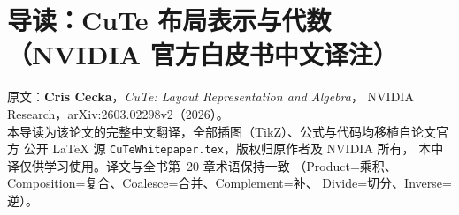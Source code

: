 \setcounter{section}{0}
\setcounter{subsection}{0}
\setcounter{subsubsection}{0}
\setcounter{figure}{0}
\setcounter{table}{0}
\setcounter{equation}{0}
\setcounter{theorem}{0}
\renewcommand{\thesection}{\arabic{section}}
\renewcommand{\thesubsection}{\arabic{section}.\arabic{subsection}}
\renewcommand{\thesubsubsection}{\arabic{section}.\arabic{subsection}.\arabic{subsubsection}}
\renewcommand{\thefigure}{W.\arabic{figure}}
\renewcommand{\thetable}{W.\arabic{table}}
\renewcommand{\theequation}{W.\arabic{equation}}
\renewcommand{\thetheorem}{W.\arabic{theorem}}
\def\wph#1{\section{#1}}
\def\wpsh#1{\subsection{#1}}
\def\wpssh#1{\subsubsection{#1}}

\chapter*{导读：CuTe 布局表示与代数\\（NVIDIA 官方白皮书中文译注）}

\begin{center}
\small
原文：\textbf{Cris Cecka}，\emph{CuTe: Layout Representation and Algebra}，
NVIDIA Research，arXiv:2603.02298v2（2026）。\\[2pt]
本导读为该论文的完整中文翻译，全部插图（TikZ）、公式与代码均移植自论文官方
公开 \LaTeX{} 源 \texttt{CuTeWhitepaper.tex}，版权归原作者及 NVIDIA 所有，
本中译仅供学习使用。译文与全书第~20 章术语保持一致
（Product=乘积、Composition=复合、Coalesce=合并、Complement=补、
Divide=切分、Inverse=逆）。
\end{center}

